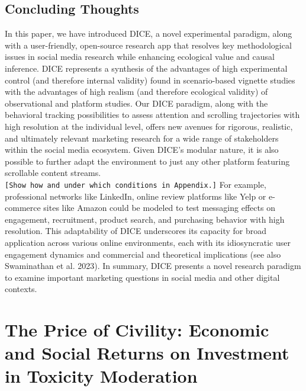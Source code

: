 \documentclass[
  a4paper,
]{scrreprt}
\begin{document}
\hypertarget{concluding-thoughts}{%
\section{Concluding Thoughts}\label{concluding-thoughts}}

In this paper, we have introduced DICE, a novel experimental paradigm,
along with a user-friendly, open-source research app that resolves key
methodological issues in social media research while enhancing
ecological value and causal inference. DICE represents a synthesis of
the advantages of high experimental control (and therefore internal
validity) found in scenario-based vignette studies with the advantages
of high realism (and therefore ecological validity) of observational and
platform studies. Our DICE paradigm, along with the behavioral tracking
possibilities to assess attention and scrolling trajectories with high
resolution at the individual level, offers new avenues for rigorous,
realistic, and ultimately relevant marketing research for a wide range
of stakeholders within the social media ecosystem. Given DICE's modular
nature, it is also possible to further adapt the environment to just any
other platform featuring scrollable content streams.
\texttt{{[}Show\ how\ and\ under\ which\ conditions\ in\ Appendix.{]}}
For example, professional networks like LinkedIn, online review
platforms like Yelp or e-commerce sites like Amazon could be modeled to
test messaging effects on engagement, recruitment, product search, and
purchasing behavior with high resolution. This adaptability of DICE
underscores its capacity for broad application across various online
environments, each with its idiosyncratic user engagement dynamics and
commercial and theoretical implications (see also Swaminathan et al.
2023). In summary, DICE presents a novel research paradigm to examine
important marketing questions in social media and other digital
contexts.

\hypertarget{the-price-of-civility-economic-and-social-returns-on-investment-in-toxicity-moderation}{%
\chapter{The Price of Civility: Economic and Social Returns on
Investment in Toxicity
Moderation}\label{the-price-of-civility-economic-and-social-returns-on-investment-in-toxicity-moderation}}
\end{document}
